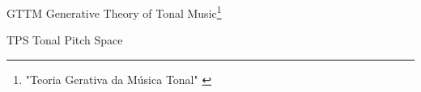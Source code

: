 \documentclass[
	12pt,				%
	openright,			%
	twoside,			%
	a4paper,			%
	english,			%
	french,				%
	spanish,			%
	brazil				%
	]{abntex2}
\begin{document}

\listoffigures*
\cleardoublepage


\begin{siglas}
  \item[GTTM] Generative Theory of Tonal Music\footnote{ "Teoria Gerativa da Música Tonal"      \cite{lerdahl1983generative} }
  \item[TPS] Tonal Pitch Space
\end{siglas}

\end{document}
